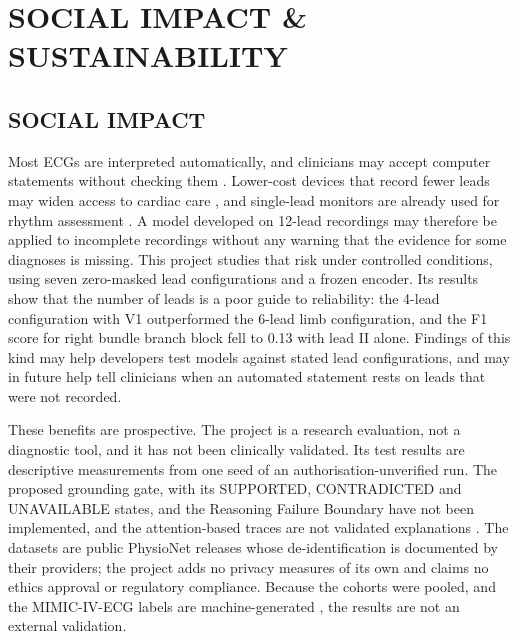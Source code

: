 
\chapter{SOCIAL IMPACT \& SUSTAINABILITY}
\label{chap:ch5}

\section{SOCIAL IMPACT}\label{sec:ch5_1}

Most ECGs are interpreted automatically, and clinicians may accept computer statements without checking them \cite{SCHLAPFER2017COMPUTER}. Lower-cost devices that record fewer leads may widen access to cardiac care \cite{REYNA2022ISSUES}, and single-lead monitors are already used for rhythm assessment \cite{HANNUN2019CARDIOLOGIST}. A model developed on 12-lead recordings may therefore be applied to incomplete recordings without any warning that the evidence for some diagnoses is missing. This project studies that risk under controlled conditions, using seven zero-masked lead configurations and a frozen encoder. Its results show that the number of leads is a poor guide to reliability: the 4-lead configuration with V1 outperformed the 6-lead limb configuration, and the F1 score for right bundle branch block fell to 0.13 with lead II alone. Findings of this kind may help developers test models against stated lead configurations, and may in future help tell clinicians when an automated statement rests on leads that were not recorded.

These benefits are prospective. The project is a research evaluation, not a diagnostic tool, and it has not been clinically validated. Its test results are descriptive measurements from one seed of an authorisation-unverified run. The proposed grounding gate, with its SUPPORTED, CONTRADICTED and UNAVAILABLE states, and the Reasoning Failure Boundary have not been implemented, and the attention-based traces are not validated explanations \cite{GHASSEMI2021FALSEHOPE,JAIN2019ATTENTION}. The datasets are public PhysioNet releases whose de-identification is documented by their providers; the project adds no privacy measures of its own and claims no ethics approval or regulatory compliance. Because the cohorts were pooled, and the MIMIC-IV-ECG labels are machine-generated \cite{GOW2023MIMICIVECG}, the results are not an external validation.

